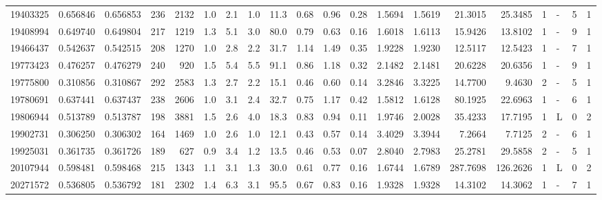 \begin{center}
\begin{tabular}{rccrrccrrrrrrrrrrlrr}
  19403325 & 0.656846 & 0.656853 &  236 & 2132 &      1.0 &      2.1 &     1.0 &    11.3 &   0.68 &   0.96 &       0.28 &  1.5694 &  1.5619 &   21.3015 &   25.3485 &       1 &             - &        5 &         1 \\
  19408994 & 0.649740 & 0.649804 &  217 & 1219 &      1.3 &      5.1 &     3.0 &    80.0 &   0.79 &   0.63 &       0.16 &  1.6018 &  1.6113 &   15.9426 &   13.8102 &       1 &             - &        9 &         1 \\
  19466437 & 0.542637 & 0.542515 &  208 & 1270 &      1.0 &      2.8 &     2.2 &    31.7 &   1.14 &   1.49 &       0.35 &  1.9228 &  1.9230 &   12.5117 &   12.5423 &       1 &             - &        7 &         1 \\
  19773423 & 0.476257 & 0.476279 &  240 &  920 &      1.5 &      5.4 &     5.5 &    91.1 &   0.86 &   1.18 &       0.32 &  2.1482 &  2.1481 &   20.6228 &   20.6356 &       1 &             - &        9 &         1 \\
  19775800 & 0.310856 & 0.310867 &  292 & 2583 &      1.3 &      2.7 &     2.2 &    15.1 &   0.46 &   0.60 &       0.14 &  3.2846 &  3.3225 &   14.7700 &    9.4630 &       2 &             - &        5 &         1 \\
  19780691 & 0.637441 & 0.637437 &  238 & 2606 &      1.0 &      3.1 &     2.4 &    32.7 &   0.75 &   1.17 &       0.42 &  1.5812 &  1.6128 &   80.1925 &   22.6963 &       1 &             - &        6 &         1 \\
  19806944 & 0.513789 & 0.513787 &  198 & 3881 &      1.5 &      2.6 &     4.0 &    18.3 &   0.83 &   0.94 &       0.11 &  1.9746 &  2.0028 &   35.4233 &   17.7195 &       1 &             L &        0 &         2 \\
  19902731 & 0.306250 & 0.306302 &  164 & 1469 &      1.0 &      2.6 &     1.0 &    12.1 &   0.43 &   0.57 &       0.14 &  3.4029 &  3.3944 &    7.2664 &    7.7125 &       2 &             - &        6 &         1 \\
  19925031 & 0.361735 & 0.361726 &  189 &  627 &      0.9 &      3.4 &     1.2 &    13.5 &   0.46 &   0.53 &       0.07 &  2.8040 &  2.7983 &   25.2781 &   29.5858 &       2 &             - &        5 &         1 \\
  20107944 & 0.598481 & 0.598468 &  215 & 1343 &      1.1 &      3.1 &     1.3 &    30.0 &   0.61 &   0.77 &       0.16 &  1.6744 &  1.6789 &  287.7698 &  126.2626 &       1 &             L &        0 &         2 \\
  20271572 & 0.536805 & 0.536792 &  181 & 2302 &      1.4 &      6.3 &     3.1 &    95.5 &   0.67 &   0.83 &       0.16 &  1.9328 &  1.9328 &   14.3102 &   14.3062 &       1 &             - &        7 &         1 \\

\end{tabular}
\end{center}
